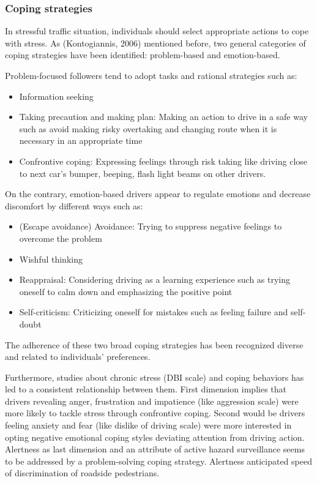 \documentclass[
11pt, %
oneside, %
english, %
singlespacing, %
]{macthesis} %
\begin{document}
\hypertarget{coping-strategies}{%
\subsubsection{Coping strategies}\label{coping-strategies}}

In stressful traffic situation, individuals should select appropriate actions to cope with stress. As (Kontogiannis, 2006) mentioned before, two general categories of coping strategies have been identified: problem-based and emotion-based.

Problem-focused followers tend to adopt tasks and rational strategies such as:
\begin{itemize}
\item
  Information seeking
\item
  Taking precaution and making plan: Making an action to drive in a safe way such as avoid making risky overtaking and changing route when it is necessary in an appropriate time
\item
  Confrontive coping: Expressing feelings through risk taking like driving close to next car's bumper, beeping, flash light beams on other drivers.
\end{itemize}
On the contrary, emotion-based drivers appear to regulate emotions and decrease discomfort by different ways such as:
\begin{itemize}
\item
  (Escape avoidance) Avoidance: Trying to suppress negative feelings to overcome the problem
\item
  Wishful thinking
\item
  Reappraisal: Considering driving as a learning experience such as trying oneself to calm down and emphasizing the positive point
\item
  Self-criticism: Criticizing oneself for mistakes such as feeling failure and self-doubt
\end{itemize}
The adherence of these two broad coping strategies has been recognized diverse and related to individuals' preferences.

Furthermore, studies about chronic stress (DBI scale) and coping behaviors has led to a consistent relationship between them. First dimension implies that drivers revealing anger, frustration and impatience (like aggression scale) were more likely to tackle stress through confrontive coping. Second would be drivers feeling anxiety and fear (like dislike of driving scale) were more interested in opting negative emotional coping styles deviating attention from driving action. Alertness as last dimension and an attribute of active hazard surveillance seems to be addressed by a problem-solving coping strategy. Alertness anticipated speed of discrimination of roadside pedestrians.
\end{document}
